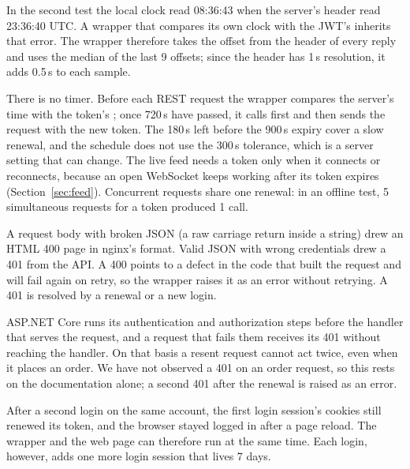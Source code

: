 

 In the second test the local clock read 08:36:43 when the server's  header read 23:36:40 UTC. A wrapper that compares its own clock with the JWT's  inherits that error. The wrapper therefore takes the offset from the  header of every reply and uses the median of the last 9 offsets; since the header has 1\,s resolution, it adds 0.5\,s to each sample.

 There is no timer. Before each REST request the wrapper compares the server's time with the token's ; once 720\,s have passed, it calls  first and then sends the request with the new token. The 180\,s left before the 900\,s expiry cover a slow renewal, and the schedule does not use the 300\,s tolerance, which is a server setting that can change. The live feed needs a token only when it connects or reconnects, because an open WebSocket keeps working after its token expires (Section~\ref{sec:feed}). Concurrent requests share one renewal: in an offline test, 5 simultaneous requests for a token produced 1  call.

 A request body with broken JSON (a raw carriage return inside a string) drew an HTML 400 page in nginx's format. Valid JSON with wrong credentials drew a 401 from the API. A 400 points to a defect in the code that built the request and will fail again on retry, so the wrapper raises it as an error without retrying. A 401 is resolved by a renewal or a new login.

 ASP.NET Core runs its authentication and authorization steps before the handler that serves the request, and a request that fails them receives its 401 without reaching the handler. On that basis a resent request cannot act twice, even when it places an order. We have not observed a 401 on an order request, so this rests on the documentation alone; a second 401 after the renewal is raised as an error.

 After a second login on the same account, the first login session's cookies still renewed its token, and the browser stayed logged in after a page reload. The wrapper and the web page can therefore run at the same time. Each login, however, adds one more login session that lives 7 days.

